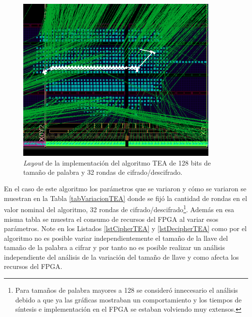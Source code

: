 \begin{figure}[H]
	\centering
	\includegraphics[width=0.9\textwidth]{./images/fig128_32_layout}
	\caption{\textit{Layout} de la implementación del algoritmo TEA de 128 bits de tamaño de palabra y 32 rondas de cifrado/descifrado.}
	\label{fig128_32_layout}
\end{figure}


En el caso de este algoritmo los parámetros que se variaron y cómo se variaron se muestran en la Tabla \ref{tabVariacionTEA} donde se fijó la cantidad de rondas en el valor nominal del algoritmo, 32 rondas de cifrado/descifrado\footnote{Para tamaños de palabra mayores a 128 se consideró innecesario el análisis debido a que ya las gráficas mostraban un comportamiento y los tiempos de síntesis e implementación en el FPGA se estaban volviendo muy extensos.}.  Además en esa misma tabla se muestra el consumo de recursos del FPGA al variar esos parámetros. Note en los Listados \ref{lstCipherTEA} y \ref{lstDecipherTEA} como por el algoritmo no es posible variar independientemente el tamaño de la llave del tamaño de la palabra a cifrar y por tanto no es posible realizar un análisis independiente del análisis de la variación del tamaño de llave y como afecta los recursos del FPGA. 

